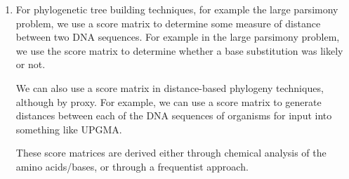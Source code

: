 \begin{enumerate}[label=(\alph*)]
\item
  For phylogenetic tree building techniques, for example the large parsimony problem, we use a score matrix to determine some measure of distance between two DNA sequences. For example in the large parsimony problem, we use the score matrix to determine whether a base substitution was likely or not.

  We can also use a score matrix in distance-based phylogeny techniques, although by proxy. For example, we can use a score matrix to generate distances between each of the DNA sequences of organisms for input into something like UPGMA.

  These score matrices are derived either through chemical analysis of the amino acids/bases, or through a frequentist approach.



        
\end{enumerate}

